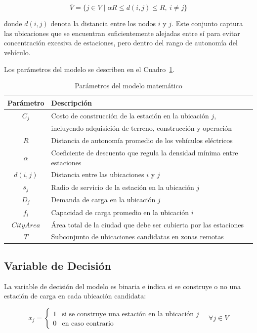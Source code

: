 \documentclass[letter, 10pt]{article}
\begin{document}
\[
\bar{V} = \{j \in V \mid \alpha R \leq d(i,j) \leq R,\ i \neq j\}
\]

donde $d(i,j)$ denota la distancia entre los nodos $i$ y $j$. Este conjunto captura las 
ubicaciones que se encuentran suficientemente alejadas entre sí para evitar concentración 
excesiva de estaciones, pero dentro del rango de autonomía del vehículo.

Los parámetros del modelo se describen en el Cuadro~\ref{tab:parametros}.

\begin{table}[h]
\centering
\caption{Parámetros del modelo matemático}
\label{tab:parametros}
\begin{tabular}{cl}
\hline
\textbf{Parámetro} & \textbf{Descripción} \\
\hline
$C_j$       & Costo de construcción de la estación en la ubicación $j$, \\
            & incluyendo adquisición de terreno, construcción y operación \\
$R$         & Distancia de autonomía promedio de los vehículos eléctricos \\
$\alpha$    & Coeficiente de descuento que regula la densidad mínima entre estaciones \\
$d(i,j)$   & Distancia entre las ubicaciones $i$ y $j$ \\
$s_j$       & Radio de servicio de la estación en la ubicación $j$ \\
$D_j$       & Demanda de carga en la ubicación $j$ \\
$f_i$       & Capacidad de carga promedio en la ubicación $i$ \\
$\mathit{CityArea}$ & Área total de la ciudad que debe ser cubierta por las estaciones \\
$T$         & Subconjunto de ubicaciones candidatas en zonas remotas \\
\hline
\end{tabular}
\end{table}

\subsection{Variable de Decisión}

La variable de decisión del modelo es binaria e indica si se construye o no una estación 
de carga en cada ubicación candidata:

\[
x_j = \begin{cases} 1 & \text{si se construye una estación en la ubicación } j \\ 
0 & \text{en caso contrario} \end{cases} \quad \forall j \in V
\]
\end{document}

